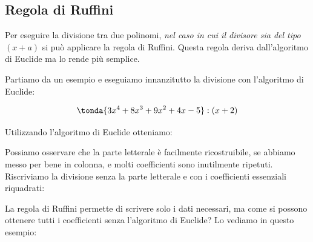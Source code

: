 \subsection{Regola di Ruffini}
\label{subsec:divpol_divisione_ruffini}

Per eseguire la divisione tra due polinomi, \emph{nel caso in cui il
divisore sia del tipo \((x+a)\)} si può applicare la regola di Ruffini.
Questa regola deriva dall'algoritmo di Euclide ma lo rende più semplice.

% 

Partiamo da un esempio e eseguiamo innanzitutto la divisione con 
l'algoritmo di Euclide:


\[\tonda{3 x^4 +8 x^3 +9 x^2 +4 x -5} : (x + 2)\]

Utilizzando l'algoritmo di Euclide otteniamo:

{\ruffinia}

Possiamo osservare che la parte letterale è facilmente ricostruibile, se 
abbiamo messo per bene in colonna, e molti coefficienti sono inutilmente 
ripetuti. Riscriviamo la divisione senza la parte letterale e con i
coefficienti essenziali riquadrati:

La regola di Ruffini permette di scrivere solo i dati necessari,
ma come si possono ottenere tutti i coefficienti senza l'algoritmo di 
Euclide?
Lo vediamo in questo esempio:

